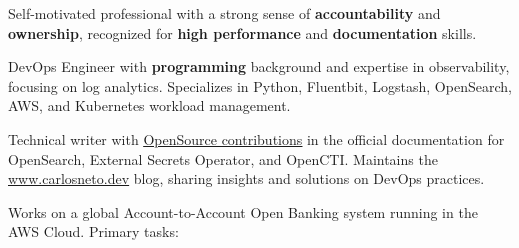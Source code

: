 \documentclass[10pt,a4paper]{altacv}
\begin{document}



\begin{fullwidth}
    \makecvheader
\end{fullwidth}

\bigskip



Self-motivated professional with a strong sense of \textbf{accountability} and \textbf{ownership}, recognized for \textbf{high performance} and \textbf{documentation} skills.

\bigskip


DevOps Engineer with \textbf{programming} background and expertise in observability, focusing on log analytics. Specializes in Python, Fluentbit, Logstash, OpenSearch, AWS, and Kubernetes workload management.

\bigskip

Technical writer with \href{https://carlosneto.dev/whoami/#opensource-contributions}{\uline{OpenSource contributions}} in the official documentation for OpenSearch, External Secrets Operator, and OpenCTI. Maintains the \href{https://www.carlosneto.dev/}{\uline{www.carlosneto.dev}} blog, sharing insights and solutions on DevOps practices.


\bigskip
\bigskip



Works on a global Account-to-Account Open Banking system running in the AWS Cloud. Primary tasks:
\end{document}
